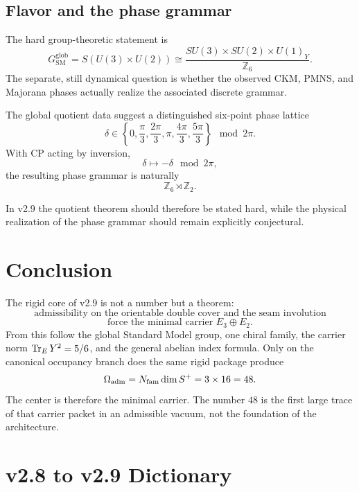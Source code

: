 \subsection{Flavor and the phase grammar}

The hard group-theoretic statement is
\[
G_{\mathrm{SM}}^{\mathrm{glob}}
=
S(U(3)\times U(2))
\cong \frac{SU(3)\times SU(2)\times U(1)_Y}{\mathbb Z_6}.
\]
The separate, still dynamical question is whether the observed CKM, PMNS, and Majorana phases actually realize the associated discrete grammar.

\begin{conjecture}
The global quotient data suggest a distinguished six-point phase lattice
\[
\delta \in \left\{
0,\frac{\pi}{3},\frac{2\pi}{3},\pi,\frac{4\pi}{3},\frac{5\pi}{3}
\right\}\mod 2\pi.
\]
With CP acting by inversion,
\[
\delta \mapsto -\delta \mod 2\pi,
\]
the resulting phase grammar is naturally
\[
\mathbb Z_6\rtimes \mathbb Z_2.
\]
\end{conjecture}

In v2.9 the quotient theorem should therefore be stated hard, while the physical realization of the phase grammar should remain explicitly conjectural.

\section{Conclusion}

The rigid core of v2.9 is not a number but a theorem:
\[
\boxed{
\text{admissibility on the orientable double cover and the seam involution}
}
\]
\[
\boxed{
\text{force the minimal carrier }E_3\oplus E_2.
}
\]
From this follow the global Standard Model group, one chiral family, the carrier norm $\operatorname{Tr}_EY^2=5/6$, and the general abelian index formula. Only on the canonical occupancy branch does the same rigid package produce
\[
\Omega_{\mathrm{adm}} = N_{\mathrm{fam}}\dim S^+ = 3\times 16 = 48.
\]
The center is therefore the minimal carrier. The number $48$ is the first large trace of that carrier packet in an admissible vacuum, not the foundation of the architecture.

\appendix

\section{v2.8 to v2.9 Dictionary}

